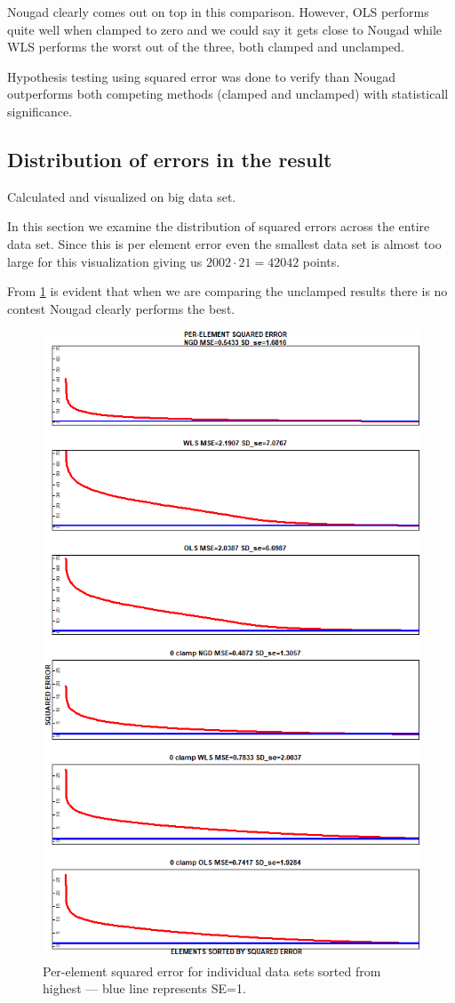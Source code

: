 Nougad clearly comes out on top in this comparison. However, OLS performs quite well when clamped to zero and we could say it gets close to Nougad while WLS performs the worst out of the three, both clamped and unclamped.

Hypothesis testing using squared error was done to verify than Nougad outperforms both competing methods (clamped and unclamped) with statisticall significance.

\subsection{Distribution of errors in the result}
Calculated and visualized on big data set.


In this section we examine the distribution of squared errors across the entire data set. Since this is per element error even the smallest data set is almost too large for this visualization giving us $2002\cdot21=42042$ points. 

From \cref{fig:SE_auc} is evident that when we are comparing the unclamped results there is no contest Nougad clearly performs the best.

\begin{figure}
  \includegraphics[width=0.9\linewidth]{img/SE_auc.png}
  \caption{Per-element squared error for individual data sets sorted from highest --- blue line represents SE=1.}
  \label{fig:SE_auc}
\end{figure}

